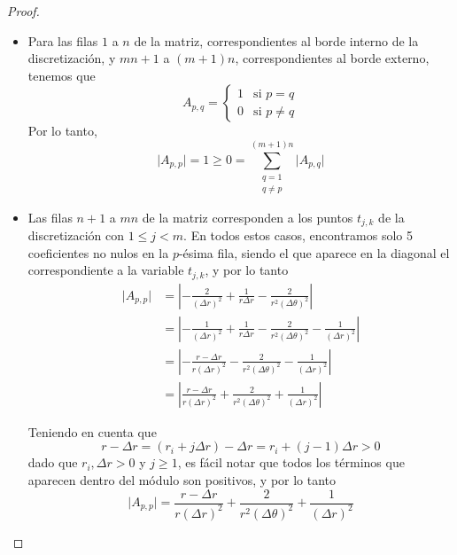       \begin{proof} \ 
        \begin{itemize}
          \item Para las filas $1$ a $n$ de la matriz, correspondientes al borde interno de la discretización, y $mn + 1 $ a $(m+1)n$, correspondientes al borde externo, tenemos que
            \[ A_{p,q} = \begin{cases}
              1 & \text{si $p = q$} \\
              0 & \text{si $p \neq q$}
            \end{cases} \]
          Por lo tanto,
            \[ \vert A_{p,p} \vert = 1 \geq 0 = \sum_{\substack{q=1 \\ q \neq p}}^{(m+1)n} \vert A_{p,q} \vert \]

          \item Las filas $n + 1$ a $mn$ de la matriz corresponden a los puntos $t_{j,k}$ de la discretización con $1 \leq j < m$. En todos estos casos, encontramos solo 5 coeficientes no nulos en la $p$-ésima fila, siendo el que aparece en la diagonal el correspondiente a la variable $t_{j,k}$, y por lo tanto
            \[ \begin{split}
              \vert A_{p,p} \vert &= \left \vert - \frac{2}{(\Delta r)^2} + \frac{1}{r \Delta r} - \frac{2}{r^2 (\Delta \theta)^2} \right \vert \\
              &= \left \vert - \frac{1}{(\Delta r)^2} + \frac{1}{r \Delta r} - \frac{2}{r^2 (\Delta \theta)^2} - \frac{1}{(\Delta r)^2} \right \vert \\
              &= \left \vert - \frac{r - \Delta r}{r (\Delta r)^2} - \frac{2}{r^2 (\Delta \theta)^2} - \frac{1}{(\Delta r)^2} \right \vert \\
              &= \left \vert \frac{r - \Delta r}{r (\Delta r)^2} + \frac{2}{r^2 (\Delta \theta)^2} + \frac{1}{(\Delta r)^2} \right \vert
            \end{split} \]

          Teniendo en cuenta que
            \[ r - \Delta r = (r_i + j \Delta r) - \Delta r = r_i + (j - 1) \Delta r > 0\]
          dado que $r_i, \Delta r > 0$ y $j \geq 1$, es fácil notar que todos los términos que aparecen dentro del módulo son positivos, y por lo tanto
            \[ \vert A_{p,p} \vert = \frac{r - \Delta r}{r (\Delta r)^2} + \frac{2}{r^2 (\Delta \theta)^2} + \frac{1}{(\Delta r)^2} \]


\end{itemize}
\end{proof}
